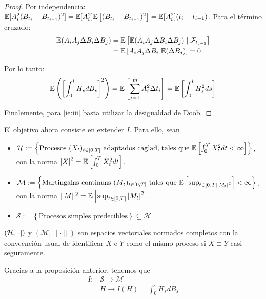 \begin{proof}
Por independencia: $\mathbb{E}[A_i^{2} (B_{t_i} - B_{t_{i-1}})^2 ] =
\mathbb{E}[A_i^2]\mathbb{E}\left[(B_{t_i} - B_{t_{i-1}})^2\right] = \mathbb{E} [A_i^2](t_{i}
- t_{i-1})$. Para el término cruzado:
\begin{align*}
        \mathbb{E} (A_i A_j \Delta B_i \Delta B_j) 
        &= \mathbb{E} \left[ \mathbb{E} (A_i A_j \Delta B_i \Delta B_j) \mid \mathcal{F}_{t_{j-1}}\right] \\
        &= \mathbb{E} \left[ A_i A_j \Delta B_i ~ \mathbb{E} (\Delta B_j) \right] = 0
\end{align*}

Por lo tanto:
\begin{equation*}
        \mathbb{E} \left( \left[ \int_{0}^{t} H_s dB_s \right]^2  \right) =
        \mathbb{E} \left[ \sum_{i=1}^{m} A_i^2 \Delta t_i \right] = \mathbb{E} \left[
                \int_{0}^{t} H_s^2 ds \right]
\end{equation*}

Finalemente, para \ref{ie:iii} basta utilizar la desigualdad de Doob.\findem
\negro
\end{proof}

\newp El objetivo ahora consiste en extender $I$. Para ello, sean 
\begin{itemize}
    \item $\mathcal{H} := \left\{ \text{Procesos } (X_t)_{t \in [0,T]}
            \text{ adaptados caglad, tales que } \mathbb{E} \left[ \int_{0}^{T}
            X^2_t dt < \infty \right] \right\}$, con la norma 
            $\abs{X}^2 = \mathbb{E} \left[ \int_{0}^{T} X^2_t dt \right]$.
    \item $\mathcal{M}  := \left\{ \text{Martingalas continuas } (M_t)_{t \in [0,T]} 
            \text{ tales que } \mathbb{E}\left[ \sup_{t \in [0,T] \abs{M_t}^2} \right] < \infty \right\}$, 
            con la norma $ \|M\|^2 = \mathbb{E} \left[\sup_{t \in [0,T]} \abs{M_t}^2 \right]$.
    \item $\mathcal{S} := \left\{\text{Procesos simples predecibles} \right\} \subseteq \mathcal{H}$
\end{itemize}

\begin{remark}
        $(\mathcal{H},\abs{\cdot})$ y $(\mathcal{M}, \|\cdot\|)$ son espacios vectoriales normados completos 
        con la convecnción usual de identificar $X$ e $Y$ como el mismo proceso
        si $X \equiv Y$ casi seguramente.
\end{remark}

Gracias a la proposición anterior, tenemos que 
\begin{align*}
        I: & \mathcal{S} \to \mathcal{M} \\ 
           & H \to I(H) = \int_{0}^{\cdot} H_s dB_s 
\end{align*}

